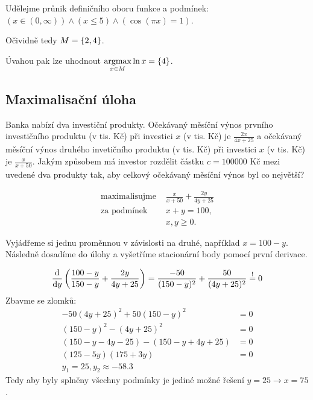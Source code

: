 Udělejme průnik definičního oboru funkce a podmínek: $(x \in (0, \infty)) \land (x \leq 5) \land (\cos(\pi x)=1)$.

\begin{multicols}{2}
\columnbreak

      \quad Očividně tedy $M = \left\lbrace 2,4 \right\rbrace$.

      \quad Úvahou pak lze uhodnout $\underset{x \in M}{\operatorname*{argmax}} \ln x = \left\lbrace 4 \right\rbrace$.
\end{multicols}

\subsection{Maximalisační úloha}
Banka nabízí dva investiční produkty. Očekávaný měsíční výnos prvního investičního produktu (v tis. Kč) při investici $x$
(v tis. Kč) je $\frac{2x}{4x+25}$ a očekávaný měsíční výnos druhého invetičního produktu (v tis. Kč) při investici $x$
(v tis. Kč) je $\frac{x}{x+50}$. Jakým způsobem má investor rozdělit částku $c = 100000$ Kč mezi uvedené dva produkty tak,
aby celkový očekávaný měsíční výnos byl co největší?

\begin{align*}
    \text{maximalisujme } &\frac{x}{x+50} + \frac{2y}{4y + 25}\\
    \text{za podmínek } &  x+y = 100, \\
    & x,y \geq 0.
\end{align*}

Vyjádřeme si jednu proměnnou v závislosti na druhé, například $x = 100 - y$. Následně dosadíme do úlohy a vyšetříme
stacionární body pomocí první derivace.

\[
    \frac{\mathop{}\!\mathrm{d}}{\mathop{}\!\mathrm{d} y} \left(\frac{100-y}{150-y} + \frac{2y}{4y + 25}\right)= \frac{-50}{(150-y)^2} + \frac{50}{(4y + 25)^2}
    \stackrel{!}{=}0
\]
Zbavme se zlomků:
\begin{align*}
    -50(4y + 25)^2 + 50(150-y)^2 &= 0 \\
    (150-y)^2 - (4y + 25)^2 &= 0 \\
    (150-y -4y - 25) - (150-y + 4y + 25) &=0\\
    (125 - 5y) (175 + 3y) &=0 \\
    y_1 = 25, y_2 \approx -58.3
\end{align*}
Tedy aby byly splněny všechny podmínky je jediné možné řešení $y = 25 \rightarrow x = 75$.

